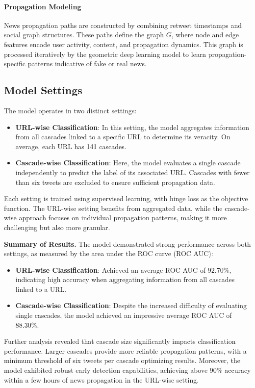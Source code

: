 \documentclass[sigconf,nonacm]{acmart}
\begin{document}
\paragraph{Propagation Modeling}
News propagation paths are constructed by combining retweet timestamps and social graph structures. These paths define the graph \( G \), where node and edge features encode user activity, content, and propagation dynamics. This graph is processed iteratively by the geometric deep learning model to learn propagation-specific patterns indicative of fake or real news.


\subsection{Model Settings}

The model operates in two distinct settings:
\begin{itemize}
    \item \textbf{URL-wise Classification}: In this setting, the model aggregates information from all cascades linked to a specific URL to determine its veracity. On average, each URL has 141 cascades.
    \item \textbf{Cascade-wise Classification}: Here, the model evaluates a single cascade independently to predict the label of its associated URL. Cascades with fewer than six tweets are excluded to ensure sufficient propagation data.
\end{itemize}

Each setting is trained using supervised learning, with hinge loss as the objective function. The URL-wise setting benefits from aggregated data, while the cascade-wise approach focuses on individual propagation patterns, making it more challenging but also more granular.

\textbf{Summary of Results.}
The model demonstrated strong performance across both settings, as measured by the area under the ROC curve (ROC AUC):
\begin{itemize}
    \item \textbf{URL-wise Classification}: Achieved an average ROC AUC of $92.70\%$, indicating high accuracy when aggregating information from all cascades linked to a URL.
    \item \textbf{Cascade-wise Classification}: Despite the increased difficulty of evaluating single cascades, the model achieved an impressive average ROC AUC of $88.30\%$.
\end{itemize}

Further analysis revealed that cascade size significantly impacts classification performance. Larger cascades provide more reliable propagation patterns, with a minimum threshold of six tweets per cascade optimizing results. Moreover, the model exhibited robust early detection capabilities, achieving above $90\%$ accuracy within a few hours of news propagation in the URL-wise setting.
\end{document}
